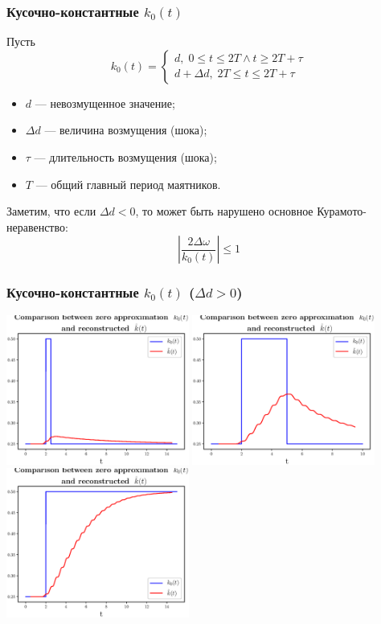 \documentclass{beamer}
\begin{document}
\begin{frame}
\frametitle{Кусочно-константные $k_0(t)$}
Пусть
\[
k_0(t)=\begin{cases}
d, \; 0 \le t \le 2T \wedge t \ge 2T+\tau \\
d+\Delta d, \; 2T \le t \le 2T+\tau
\end{cases}
\]
\begin{itemize}
	\item $d$ --- невозмущенное значение;
	\item $\Delta d$ --- величина возмущения (шока);
	\item $\tau$ --- длительность возмущения (шока);
	\item $T$ --- общий главный период маятников.
\end{itemize}

Заметим, что если $\Delta d < 0$, то может быть нарушено основное Курамото-неравенство:
\[
\left|\frac{2\Delta\omega}{k_0(t)}\right|\le 1
\]
\end{frame}

\begin{frame}
\frametitle{Кусочно-константные $k_0(t)$ ($\Delta d >0$)}
\phantom{123}   
\begin{center}
	\includegraphics[width=0.45\textwidth]{2206_khat_positive_15.eps} %
	\includegraphics[width=0.45\textwidth]{2206_khat_positive_long_10.eps}
	\vfill
	\includegraphics[width=0.45\textwidth]{2206_khat_positive_end_15.eps}
\end{center}
\end{frame}
\end{document}
